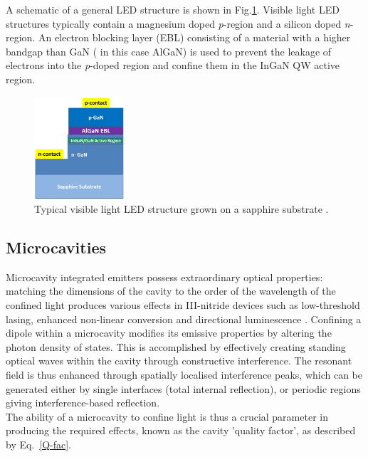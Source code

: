 \FloatBarrier

A schematic of a general LED structure is shown in Fig.\ref{1.11}. Visible light LED structures typically contain a magnesium doped {\it p}-region and a silicon doped {\it n}-region. An electron blocking layer  (EBL) consisting of a material with a higher bandgap than GaN ( in this case AlGaN) is used to prevent the leakage of electrons into the {\it p}-doped region and confine them in the InGaN QW active region.

\begin{figure}[h]
	\centering
	\includegraphics[width=0.3\textwidth]{Figs/Ch1/led.png}
	\caption {Typical visible light LED structure grown on a sapphire substrate \cite{Ren2015}.}
	\label{1.11}
\end{figure}
\FloatBarrier 

\subsection{Microcavities}

Microcavity integrated emitters possess extraordinary optical properties: matching the dimensions of the cavity to the order of the wavelength of the confined light produces various effects in III-nitride devices such as low-threshold lasing, enhanced non-linear conversion and directional luminescence \cite{Christopoulos2007}. Confining a dipole within a microcavity modifies its emissive properties by altering the photon density of states. This is accomplished by effectively creating standing optical waves within the cavity through constructive interference. The resonant field is thus enhanced through spatially localised interference peaks, which can be generated either by single interfaces (total internal reflection), or periodic regions giving interference-based reflection. \\ The ability of a microcavity to confine light is thus a crucial parameter in producing the required effects, known as the cavity 'quality factor', as described by Eq.~\ref{Q-fac}.

